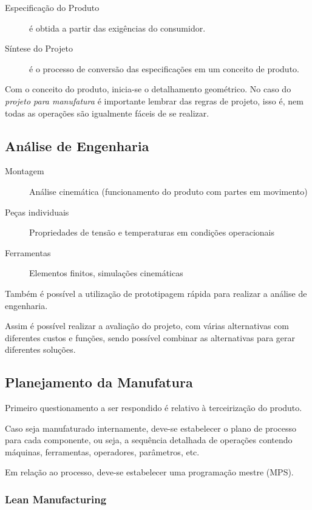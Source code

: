 \documentclass[a4paper]{report}
\begin{document}
\begin{description}
    \item[Especificação do Produto] é obtida a partir das exigências do consumidor.
    \item[Síntese do Projeto] é o processo de conversão das especificações em um conceito de produto.
\end{description}

Com o conceito do produto, inicia-se o detalhamento geométrico. No caso do \emph{projeto para manufatura} é importante lembrar das regras de projeto, isso é, nem todas as operações são igualmente fáceis de se realizar.

\subsection*{Análise de Engenharia}

\begin{description}
    \item[Montagem] Análise cinemática (funcionamento do produto com partes em movimento)
    \item[Peças individuais] Propriedades de tensão e temperaturas em condições operacionais
    \item[Ferramentas] Elementos finitos, simulações cinemáticas
\end{description}
Também é possível a utilização de prototipagem rápida para realizar a análise de engenharia.

Assim é possível realizar a avaliação do projeto, com várias alternativas com diferentes custos e funções, sendo possível combinar as alternativas para gerar diferentes soluções.

\subsection*{Planejamento da Manufatura}

Primeiro questionamento a ser respondido é relativo à terceirização do produto.

Caso seja manufaturado internamente, deve-se estabelecer o plano de processo para cada componente, ou seja, a sequência detalhada de operações contendo máquinas, ferramentas, operadores, parâmetros, etc.

Em relação ao processo, deve-se estabelecer uma programação mestre (MPS).

\subsubsection*{Lean Manufacturing}
\end{document}
